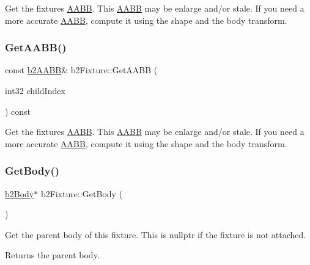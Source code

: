 Get the fixture\textquotesingle{}s \hyperlink{classAABB}{A\+A\+BB}. This \hyperlink{classAABB}{A\+A\+BB} may be enlarge and/or stale. If you need a more accurate \hyperlink{classAABB}{A\+A\+BB}, compute it using the shape and the body transform. \mbox{\label{classb2Fixture_a5081778c838ac090bc785bfbf6d76ab7}} 
\subsubsection{\texorpdfstring{Get\+A\+A\+B\+B()}{GetAABB()}\hspace{0.1cm}{\footnotesize\ttfamily [2/2]}}
{\footnotesize\ttfamily const \hyperlink{structb2AABB}{b2\+A\+A\+BB}\& b2\+Fixture\+::\+Get\+A\+A\+BB (\begin{DoxyParamCaption}\item[{int32}]{child\+Index }\end{DoxyParamCaption}) const}

Get the fixture\textquotesingle{}s \hyperlink{classAABB}{A\+A\+BB}. This \hyperlink{classAABB}{A\+A\+BB} may be enlarge and/or stale. If you need a more accurate \hyperlink{classAABB}{A\+A\+BB}, compute it using the shape and the body transform. \mbox{\label{classb2Fixture_a6f7881f21a9c401542b2fceeb1c1ed1c}} 
\subsubsection{\texorpdfstring{Get\+Body()}{GetBody()}\hspace{0.1cm}{\footnotesize\ttfamily [1/2]}}
{\footnotesize\ttfamily \hyperlink{classb2Body}{b2\+Body}$\ast$ b2\+Fixture\+::\+Get\+Body (\begin{DoxyParamCaption}{ }\end{DoxyParamCaption})}

Get the parent body of this fixture. This is nullptr if the fixture is not attached. \begin{DoxyReturn}{Returns}
the parent body. 
\end{DoxyReturn}
\mbox{\label{classb2Fixture_a9d6536ef274d768e86ab0a8330921535}} 
